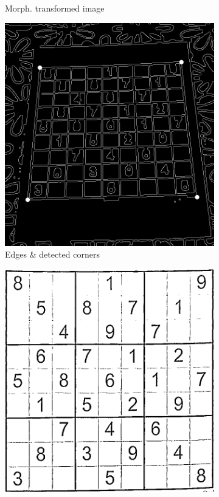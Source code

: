 \documentclass{scrartcl}
\begin{document}
\begin{figure}[!htbp]
\begin{subfigure}[b]{0.3\textwidth}
      \caption{Morph. transformed image}
    \end{subfigure}
    \begin{subfigure}[b]{0.3\textwidth}
      \centering
      \includegraphics[width=\textwidth]{pictures/results/sudoku/edge-detector.png}
      \caption{Edges \& detected corners}
      \label{figure:doc-on-table-patterns--edges}
    \end{subfigure}
    \begin{subfigure}[b]{0.3\textwidth}
      \centering
      \includegraphics[width=\textwidth]{pictures/results/sudoku/document.png}

\end{subfigure}
\end{figure}
\end{document}
